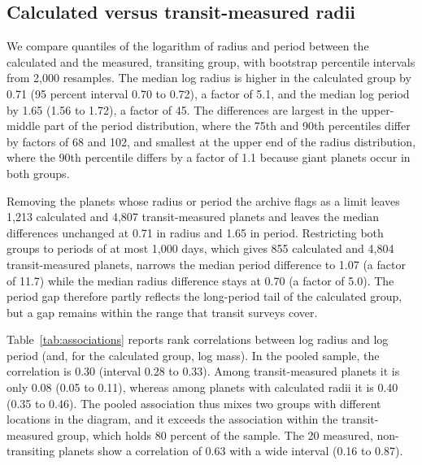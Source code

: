 \documentclass[11pt]{article}
\begin{document}
\subsection{Calculated versus transit-measured radii}

We compare quantiles of the logarithm of radius and period between the calculated and the measured, transiting group, with bootstrap percentile intervals from 2,000 resamples. The median log radius is higher in the calculated group by 0.71 (95 percent interval 0.70 to 0.72), a factor of 5.1, and the median log period by 1.65 (1.56 to 1.72), a factor of 45. The differences are largest in the upper-middle part of the period distribution, where the 75th and 90th percentiles differ by factors of 68 and 102, and smallest at the upper end of the radius distribution, where the 90th percentile differs by a factor of 1.1 because giant planets occur in both groups.

Removing the planets whose radius or period the archive flags as a limit leaves 1,213 calculated and 4,807 transit-measured planets and leaves the median differences unchanged at 0.71 in radius and 1.65 in period. Restricting both groups to periods of at most 1,000 days, which gives 855 calculated and 4,804 transit-measured planets, narrows the median period difference to 1.07 (a factor of 11.7) while the median radius difference stays at 0.70 (a factor of 5.0). The period gap therefore partly reflects the long-period tail of the calculated group, but a gap remains within the range that transit surveys cover.

Table~\ref{tab:associations} reports rank correlations between log radius and log period (and, for the calculated group, log mass). In the pooled sample, the correlation is 0.30 (interval 0.28 to 0.33). Among transit-measured planets it is only 0.08 (0.05 to 0.11), whereas among planets with calculated radii it is 0.40 (0.35 to 0.46). The pooled association thus mixes two groups with different locations in the diagram, and it exceeds the association within the transit-measured group, which holds 80 percent of the sample. The 20 measured, non-transiting planets show a correlation of 0.63 with a wide interval (0.16 to 0.87).

\end{document}
